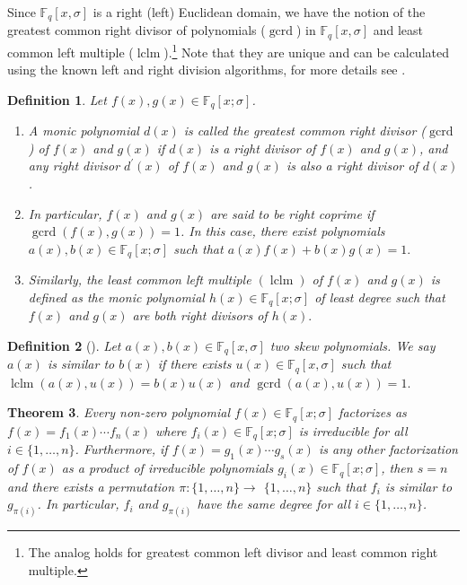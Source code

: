 \documentclass[12pt,paper]{article}
\theoremstyle{plain}
\newtheorem{theorem}{Theorem}[section] %
\newtheorem{definition}[theorem]{Definition}
\newcommand{\Fq}{\mathbb{F}_{q}}
\DeclareMathOperator{\lclm}{lclm}
\DeclareMathOperator{\gcrd}{gcrd}
\begin{document}

Since $\Fq[x,\sigma]$ is a right (left) Euclidean domain, we have the notion of the greatest common right divisor of polynomials ($\gcrd$) in $\Fq[x,\sigma]$ and  least common left multiple ($\lclm$).\footnote{The analog holds for greatest common left divisor and least common right multiple.} Note that they are unique and can be calculated using the known left and right division algorithms, for more details see \cite{Ore33}.

\begin{definition}
 Let $f(x), g(x) \in \Fq[x;\sigma]$. 
 \begin{enumerate}
     \item A monic polynomial $d(x)$ is called the \emph{greatest common right divisor} ($ \gcrd $) of $f(x)$ and $g(x)$ if  $d(x)$ is a right divisor of $f(x)$ and $g(x)$, and any right divisor  $d^{'}(x)$ of $f(x)$ and $g(x)$ is also a  right divisor of $d(x)$.
\item In particular, $f(x)$ and $ g(x) $ are said to be \emph{right coprime} if $\gcrd(f(x), g(x))=1$. 
In this case, there exist polynomials  $a(x), b(x) \in  \Fq[x;\sigma]$ such that $a(x) f(x)+b(x) g(x)=1.$
 \item Similarly, the \emph{least common left multiple} $(\lclm)$ of $f(x)$ and $g(x)$   is defined as the monic polynomial  $h(x)\in  \Fq[x;\sigma]$  of least degree such that $f(x)$ and $ g(x)$ are both  right  divisors of $h(x).$
\end{enumerate}
\end{definition}




\begin{definition}[\cite{Ore33}] Let $a(x), b(x) \in \Fq[x,\sigma]$ two skew polynomials. We say  $a(x)$ is \emph{similar} to $b(x)$ if there exists $u(x) \in \Fq[x,\sigma] $  such that $\lclm(a(x), u(x)) = b(x) u(x)$  and $\gcrd(a(x), u(x)) = 1.$
\end{definition}

\begin{theorem} \cite[Theorem 1]{Ore33}  \label{Factorization}
Every non-zero polynomial $f(x) \in \Fq[x;\sigma]$ factorizes as $f(x)=f_1(x) \cdots f_n(x)$ where $f_i(x) \in \Fq[x;\sigma]$ is irreducible for all $i \in\{1, \ldots, n\}$. Furthermore, if $f(x)=g_1(x) \cdots g_s(x)$ is any other factorization of $f(x)$ as a product of irreducible polynomials $g_i(x) \in \Fq[x;\sigma]$, then $s=n$ and there exists a permutation $\pi:\{1, \ldots, n\} \rightarrow$ $\{1, \ldots, n\}$ such that $f_i$ is similar to $g_{\pi(i)}$. In particular, $f_i$ and $g_{\pi(i)}$ have the same degree for all $i \in\{1, \ldots, n\}$.
\end{theorem}
 
\end{document}
